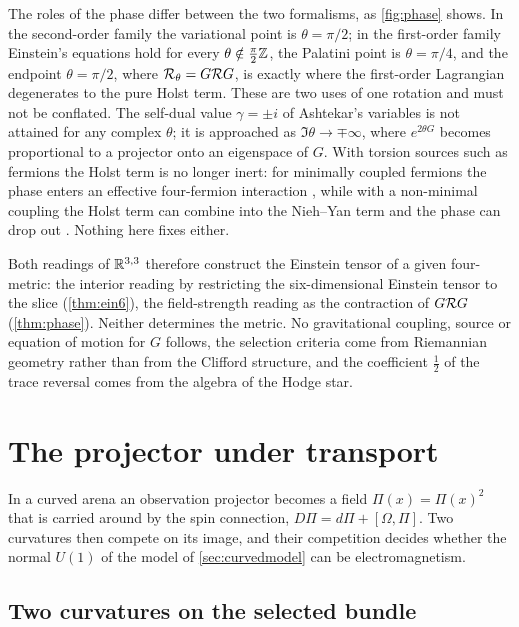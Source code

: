 The roles of the phase differ between the two formalisms, as \cref{fig:phase} shows. In the second-order family the variational point is $\theta=\pi/2$; in the
first-order family Einstein's equations hold for every $\theta\notin\tfrac\pi2\mathbb{Z}$, the Palatini point is $\theta=\pi/4$, and the endpoint $\theta=\pi/2$, where $\mathcal R_\theta=G\mathcal R G$, is
exactly where the first-order Lagrangian degenerates to the pure Holst term. These are two uses of one rotation and must not be conflated. The self-dual value
$\gamma=\pm i$ of Ashtekar's variables is not attained for any complex $\theta$; it is approached as $\Im\theta\to\mp\infty$, where $e^{2\theta G}$ becomes proportional to a
projector onto an eigenspace of $G$. With torsion sources such as fermions the Holst term is no longer inert: for minimally coupled fermions the phase enters an
effective four-fermion interaction \cite{PerezRovelli06,FreidelMinicTakeuchi05}, while with a non-minimal coupling the Holst term can combine into the Nieh--Yan
term and the phase can drop out \cite{Mercuri06}. Nothing here fixes either.

Both readings of $\mathbb{R}^{3,3}$ therefore construct the Einstein tensor of a given four-metric: the interior reading by restricting the six-dimensional Einstein tensor to
the slice (\cref{thm:ein6}), the field-strength reading as the contraction of $G\mathcal R G$ (\cref{thm:phase}). Neither determines the metric. No gravitational coupling,
source or equation of motion for $G$ follows, the selection criteria come from Riemannian geometry rather than from the Clifford structure, and the coefficient
$\tfrac12$ of the trace reversal comes from the algebra of the Hodge star.



\section{The projector under transport}
\label{sec:transport}

In a curved arena an observation projector becomes a field $\Pi(x)=\Pi(x)^2$ that is carried around by the spin connection, $D\Pi=d\Pi+[\Omega,\Pi]$. Two
curvatures then compete on its image, and their competition decides whether the normal $U(1)$ of the model of \cref{sec:curvedmodel} can be electromagnetism.

\subsection{Two curvatures on the selected bundle}

